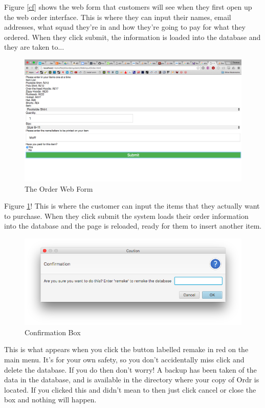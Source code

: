 \documentclass[11pt]{report}
\begin{document}
	Figure \ref{cf} shows the web form that customers will see when they first open up the web order interface. This is where they can input their names, email addresses, what squad they're in and how they're going to pay for what they ordered. When they click submit, the information is loaded into the database and they are taken to...
	\begin{figure}[H]
		\centering
		\includegraphics[width=\textwidth]{OrderForm}
		\caption{The Order Web Form}
		\label{of}
	\end{figure}
	Figure \ref{of}! This is where the customer can input the items that they actually want to purchase. When they click submit the system loads their order information into the database and the page is reloaded, ready for them to insert another item. 
	\begin{figure}[H]
		\centering
		\includegraphics[scale=0.5]{ConfirmBox}
		\caption{Confirmation Box}
		\label{cb}
	\end{figure}
	This is what appears when you click the button labelled remake in red on the main menu. It's for your own safety, so you don't accidentally miss click and delete the database. If you do then don't worry! A backup has been taken of the data in the database, and is available in the directory where your copy of Ordr is located. If you clicked this and didn't mean to then just click cancel or close the box and nothing will happen.
\end{document}
